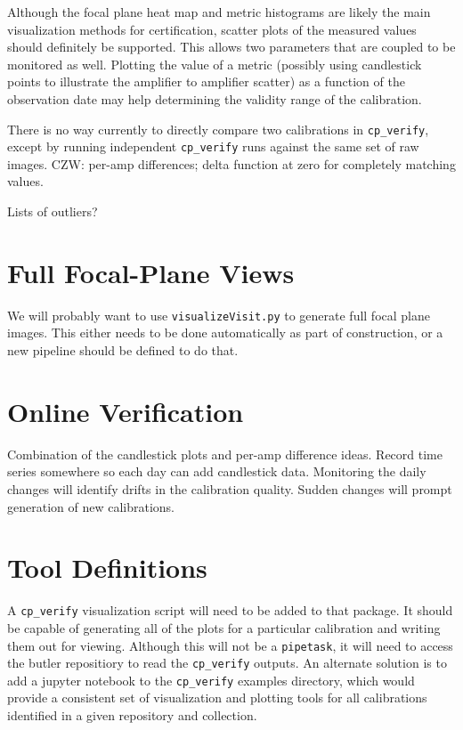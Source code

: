 \documentclass[DM,authoryear,toc]{lsstdoc}
\begin{document}
Although the focal plane heat map and metric histograms are likely the main visualization methods for certification, scatter plots of the measured values should definitely be supported.  This allows two parameters that are coupled to be monitored as well.  Plotting the value of a metric (possibly using candlestick points to illustrate the amplifier to amplifier scatter) as a function of the observation date may help determining the validity range of the calibration.

There is no way currently to directly compare two calibrations in \verb|cp_verify|, except by running independent \verb|cp_verify| runs against the same set of raw images.  CZW: per-amp differences; delta function at zero for completely matching values.

Lists of outliers?

\section{Full Focal-Plane Views}

We will probably want to use \verb|visualizeVisit.py| to generate full focal plane images.  This either needs to be done automatically as part of construction, or a new pipeline should be defined to do that.

\section{Online Verification}

Combination of the candlestick plots and per-amp difference ideas.  Record time series somewhere so each day can add candlestick data.  Monitoring the daily changes will identify drifts in the calibration quality.  Sudden changes will prompt generation of new calibrations.

\section{Tool Definitions}

A \verb|cp_verify| visualization script will need to be added to that package.  It should be capable of generating all of the plots for a particular calibration and writing them out for viewing.  Although this will not be a \verb|pipetask|, it will need to access the butler repositiory to read the \verb|cp_verify| outputs.  An alternate solution is to add a jupyter notebook to the \verb|cp_verify| examples directory, which would provide a consistent set of visualization and plotting tools for all calibrations identified in a given repository and collection.
\end{document}
